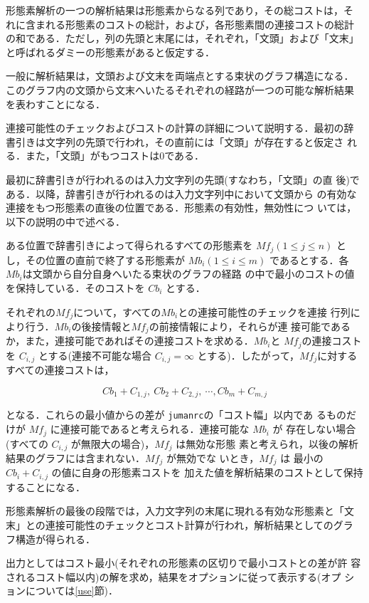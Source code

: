 \documentclass[a4j,titlepage]{jarticle}
\begin{document}
形態素解析の一つの解析結果は形態素からなる列であり，その総コストは，そ
れに含まれる形態素のコストの総計，および，各形態素間の連接コストの総計
の和である．ただし，列の先頭と末尾には，それぞれ，「文頭」および「文末」
と呼ばれるダミーの形態素があると仮定する．

一般に解析結果は，文頭および文末を両端点とする束状のグラフ構造になる．
このグラフ内の文頭から文末へいたるそれぞれの経路が一つの可能な解析結果
を表わすことになる．

連接可能性のチェックおよびコストの計算の詳細について説明する．最初の辞
書引きは文字列の先頭で行われ，その直前には「文頭」が存在すると仮定さ
れる．また，「文頭」がもつコストは0である．

最初に辞書引きが行われるのは入力文字列の先頭(すなわち，「文頭」の直
後)である．以降，辞書引きが行われるのは入力文字列中において文頭から
の有効な連接をもつ形態素の直後の位置である．形態素の有効性，無効性につ
いては，以下の説明の中で述べる．

ある位置で辞書引きによって得られるすべての形態素を $Mf_j (1 \leq j
\leq n)$ とし，その位置の直前で終了する形態素が $Mb_i (1 \leq i \leq
m)$ であるとする．各$Mb_i$は文頭から自分自身へいたる束状のグラフの経路
の中で最小のコストの値を保持している．そのコストを $Cb_i$ とする．

それぞれの$Mf_j$について，すべての$Mb_i$との連接可能性のチェックを連接
行列により行う．$Mb_i$の後接情報と$Mf_j$の前接情報により，それらが連
接可能であるか，また，連接可能であればその連接コストを求める．$Mb_i$と
$Mf_j$の連接コストを $C_{i,j}$ とする(連接不可能な場合 
$C_{i,j}=\infty$ とする)．したがって，$Mf_j$に対するすべての連接コストは，

\[ Cb_1 + C_{1,j},\ Cb_2 + C_{2,j},\ \cdots, Cb_m + C_{m,j} \]

となる．これらの最小値からの差が {\tt jumanrc}の「コスト幅」以内であ
るものだけが $Mf_j$ に連接可能であると考えられる．連接可能な $Mb_i$ が
存在しない場合(すべての $C_{i,j}$ が無限大の場合)，$Mf_j$ は無効な形態
素と考えられ，以後の解析結果のグラフには含まれない．$Mf_j$ が無効でな
いとき，$Mf_j$ は 最小の $Cb_i + C_{i,j}$ の値に自身の形態素コストを
加えた値を解析結果のコストとして保持することになる．

形態素解析の最後の段階では，入力文字列の末尾に現れる有効な形態素と「文
末」との連接可能性のチェックとコスト計算が行われ，解析結果としてのグラ
フ構造が得られる．

出力としてはコスト最小(それぞれの形態素の区切りで最小コストとの差が許
容されるコスト幅以内)の解を求め，結果をオプションに従って表示する(オプ
ションについては\ref{use}節)．
\end{document}
